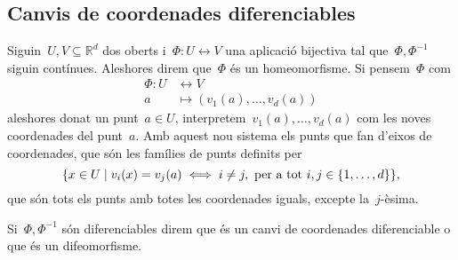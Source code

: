 \documentclass[../../main.tex]{subfiles}
\begin{document}
    \subsection{Canvis de coordenades diferenciables}
    \begin{definition}
        \label{def:homeomorfisme}
        \label{def:difeomorfisme}
        Siguin~\(U,V\subseteq\mathbb{R}^{d}\) dos oberts i~\(\Phi\colon U\longleftrightarrow V\) una aplicació bijectiva tal que~\(\Phi,\Phi^{-1}\) siguin contínues.
        Aleshores direm que~\(\Phi\) és un homeomorfisme.
        Si pensem~\(\Phi\) com
        \begin{align*}
        \Phi\colon U&\longleftrightarrow V\\
        a&\longmapsto(v_{1}(a),\dots,v_{d}(a))
        \end{align*}
        aleshores donat un punt~\(a\in U\), interpretem~\(v_{1}(a),\dots,v_{d}(a)\) com les noves coordenades del punt~\(a\).
        Amb aquest nou sistema els punts que fan d'eixos de coordenades, que són les famílies de punts definits per
        \[
            \{x\in U\mid v_{i}(x)=v_{j}(a)\iff i\neq j,\text{ per a tot }i,j\in\{1,\dots,d\}\},
        \]
        que són tots els punts amb totes les coordenades iguals, excepte la~\(j\)-èsima.

        Si~\(\Phi,\Phi^{-1}\) són diferenciables direm que és un canvi de coordenades diferenciable o que és un difeomorfisme.
    \end{definition}
\end{document}
